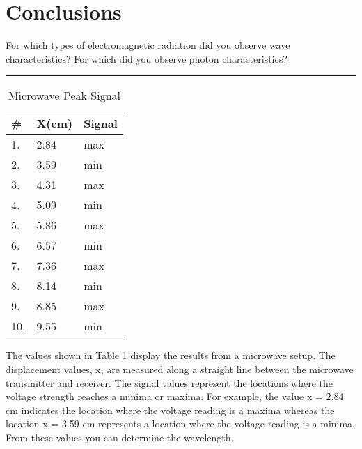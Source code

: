 \section{Conclusions}
  For which types of electromagnetic radiation did you observe wave characteristics?  For which did you observe photon characteristics?\\
\hrule 
\begin{table}[b]
\begin{minipage}{0.4\textwidth} 
\centering
\caption{Microwave Peak Signal} \label{t:microwavesignal}
\begin{tabular}{l l l}\toprule
\# & X(cm) & Signal\\
\midrule
1.	&	2.84 &	max\\
2.	&	3.59 &	min\\
3.	&	4.31	 &	max	\\
4.	&	5.09 &	min\\
5.	&	5.86 &	max\\
6.	&	6.57	 &	min\\
7.	&	7.36 &	max\\
8.	&	8.14 &	min\\
9.	&	8.85 &	max\\
10.	& 	9.55 &	min\\
\bottomrule
\end{tabular}
\end{minipage} \hfill
\begin{minipage}{0.5\textwidth} 
The values shown in Table \ref{t:microwavesignal} display the results from a microwave setup. The displacement values, x, are measured along a straight line between the microwave transmitter and receiver. The signal values represent the locations where the voltage strength reaches a minima or maxima. For example, the value x = 2.84 cm indicates the location where the voltage reading is a maxima whereas the location x = 3.59 cm represents a location where the voltage reading is a minima. From these values you can determine the wavelength.
\end{minipage}
\end{table}

\endinput
